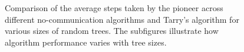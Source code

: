 \begin{figure}[H]
    \centering
    \qquad
    \qquad
    \newline
    \qquad
    \newline
    \caption{Comparison of the average steps taken by the pioneer across different no-communication algorithms and Tarry's algorithm for various sizes of random trees. The subfigures illustrate how algorithm performance varies with tree sizes.}
    \label{fig_no_comm_steps_all_sizes_tree}
\end{figure}


